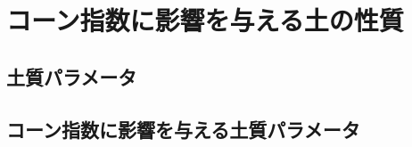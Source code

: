 \documentclass[../main]{subfiles}
\begin{document}
\graphicspath{{../figures/chap2/}}

\section{コーン指数に影響を与える土の性質}
\label{sec:the_ci_params}

\subsection{土質パラメータ}
\label{subsec:the_params_params}

\subsection{コーン指数に影響を与える土質パラメータ}
\label{subsec:the_params_ci}
\end{document}
